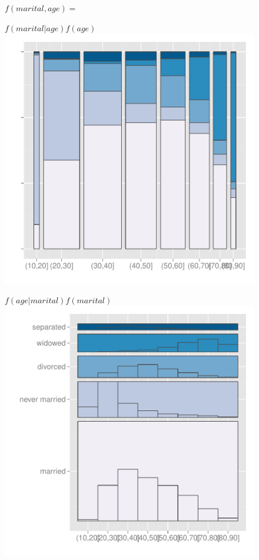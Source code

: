 \documentclass[journal]{vgtc}
\begin{document}
\begin{figure}[htbp]
  \centering
$f(marital, age) =$\\
\begin{minipage}[t]{0.49\linewidth}
\centering 
$f(marital|age)f(age)$ 
    \includegraphics[width=\linewidth]{part-marital-1}%
 \end{minipage}
\begin{minipage}[t]{0.49\linewidth}
\centering
 $f(age|marital)f(marital)$
    \includegraphics[width=\linewidth]{part-marital-2}

\end{minipage}
\end{figure}
\end{document}
